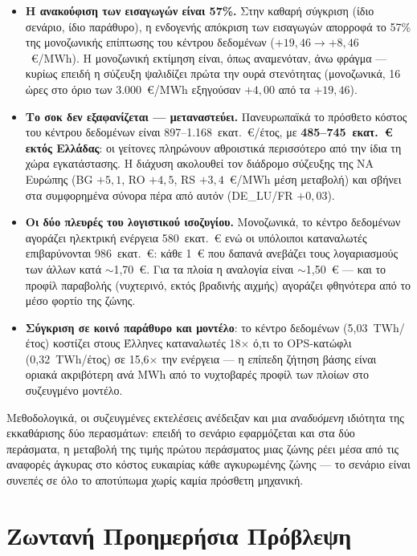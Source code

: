 \begin{itemize}
\item \textbf{Η ανακούφιση των εισαγωγών είναι 57\%.} Στην καθαρή σύγκριση (ίδιο σενάριο, ίδιο παράθυρο), η ενδογενής απόκριση των εισαγωγών απορροφά το 57\% της μονοζωνικής επίπτωσης του κέντρου δεδομένων ($+19{,}46 \to +8{,}46$~€/MWh). Η μονοζωνική εκτίμηση είναι, όπως αναμενόταν, άνω φράγμα --- κυρίως επειδή η σύζευξη ψαλιδίζει πρώτα την ουρά στενότητας (μονοζωνικά, 16 ώρες στο όριο των 3.000~€/MWh εξηγούσαν $+4{,}00$ από τα $+19{,}46$).
\item \textbf{Το σοκ δεν εξαφανίζεται --- μεταναστεύει.} Πανευρωπαϊκά το πρόσθετο κόστος του κέντρου δεδομένων είναι 897--1.168~εκατ.~€/έτος, με \textbf{485--745~εκατ.~€ εκτός Ελλάδας}: οι γείτονες πληρώνουν αθροιστικά περισσότερο από την ίδια τη χώρα εγκατάστασης. Η διάχυση ακολουθεί τον διάδρομο σύζευξης της ΝΑ Ευρώπης (BG $+5{,}1$, RO $+4{,}5$, RS $+3{,}4$~€/MWh μέση μεταβολή) και σβήνει στα συμφορημένα σύνορα πέρα από αυτόν (DE\_LU/FR $+0{,}03$).
\item \textbf{Οι δύο πλευρές του λογιστικού ισοζυγίου.} Μονοζωνικά, το κέντρο δεδομένων αγοράζει ηλεκτρική ενέργεια 580~εκατ.~€ ενώ οι υπόλοιποι καταναλωτές επιβαρύνονται 986~εκατ.~€: κάθε 1~€ που δαπανά ανεβάζει τους λογαριασμούς των άλλων κατά $\sim$1,70~€. Για τα πλοία η αναλογία είναι $\sim$1,50~€ --- και το προφίλ παραβολής (νυχτερινό, εκτός βραδινής αιχμής) αγοράζει φθηνότερα από το μέσο φορτίο της ζώνης.
\item \textbf{Σύγκριση σε κοινό παράθυρο και μοντέλο}: το κέντρο δεδομένων (5,03~TWh/έτος) κοστίζει στους Έλληνες καταναλωτές 18$\times$ ό,τι το OPS-κατώφλι (0,32~TWh/έτος) σε 15,6$\times$ την ενέργεια --- η επίπεδη ζήτηση βάσης είναι οριακά ακριβότερη ανά MWh από το νυχτοβαρές προφίλ των πλοίων στο συζευγμένο μοντέλο.
\end{itemize}

Μεθοδολογικά, οι συζευγμένες εκτελέσεις ανέδειξαν και μια \emph{αναδυόμενη} ιδιότητα της εκκαθάρισης δύο περασμάτων: επειδή το σενάριο εφαρμόζεται και στα δύο περάσματα, η μεταβολή της τιμής πρώτου περάσματος μιας ζώνης ρέει μέσα από τις αναφορές άγκυρας στο κόστος ευκαιρίας κάθε αγκυρωμένης ζώνης --- το σενάριο είναι συνεπές σε όλο το αποτύπωμα χωρίς καμία πρόσθετη μηχανική.


\section{Ζωντανή Προημερήσια Πρόβλεψη}
\label{sec:live-forecasting}

